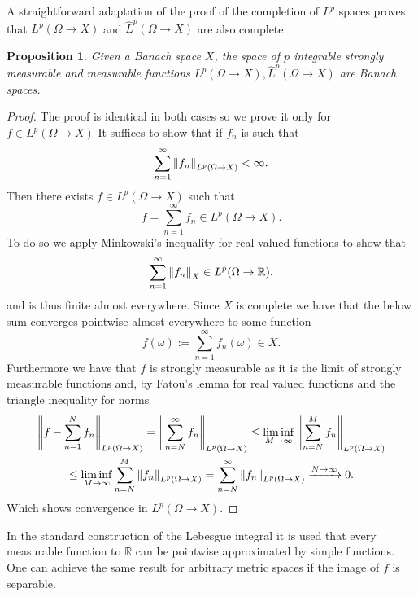 \documentclass[12pt]{article}
\newtheorem{proposition}{Proposition}
\begin{document}
A straightforward adaptation of the proof of the completion of $L^p$ spaces proves that $L^p(\Omega\to X)$ and $\hat{L}^p(\Omega\to X)$ are also complete.
\begin{proposition}
    Given a Banach space $X$, the space of $p$ integrable strongly measurable and measurable functions $L^p(\Omega\to X),\hat{L}^p(\Omega\to X)$ are Banach spaces.
\end{proposition}
\begin{proof}
    The proof is identical in both cases so we prove it only for $f\in L^p(\Omega\to X)$
    It suffices to show that if $f_n$ is such that
    \begin{equation*}
        \sum_{n=1}^\infty \norm{f_n}_{L^p(\Omega\to X)}<\infty.
    \end{equation*}
    Then there exists $f\in L^p(\Omega\to X)$ such that
    \begin{equation*}
        f=\sum_{n=1}^\infty f_n\in L^p(\Omega\to X).
    \end{equation*}
    To do so we apply Minkowski's inequality for real valued functions to show that
    \begin{equation*}
        \sum_{n=1}^\infty \norm{f_n}_X\in L^p(\Omega\to{\mathbb R}).
    \end{equation*}
    and is thus finite almost everywhere. Since $X$ is complete we have that the below sum converges pointwise almost everywhere to some function
    \begin{equation*}
        f(\omega):=\sum_{n=1}^\infty f_n(\omega)\in X.
    \end{equation*}
    Furthermore we have that $f$ is strongly measurable as it is the limit of strongly measurable functions and, by Fatou's lemma for real valued functions and the triangle inequality for norms
    \begin{multline*}
        \norm{f-\sum_{n=1}^N f_n}_{L^p(\Omega\to X)}=\norm{\sum_{n=N}^\infty f_n}_{L^p(\Omega\to X)}\leq \liminf_{M\to \infty}\norm{\sum_{n=N}^M f_n}_{L^p(\Omega\to X)}\\\leq \liminf_{M\to \infty}\sum_{n=N}^M \norm{f_n}_{L^p(\Omega\to X)}=\sum_{n=N}^\infty \norm{f_n}_{L^p(\Omega\to X)}\xrightarrow{N\to\infty} 0.
    \end{multline*}
    Which shows convergence in $L^p(\Omega\to X)$.
\end{proof}
In the standard construction of the Lebesgue integral it is used that every measurable function to $\mathbb{R}$ can be pointwise approximated by simple functions. One can achieve the same result for arbitrary metric spaces if the image of $f$ is separable.
\end{document}
